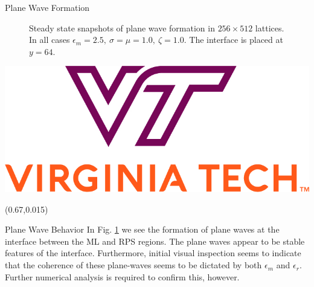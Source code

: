 \documentclass{beamer}
\begin{document}
\begin{frame}{}
\begin{textblock}{0.32}
\begin{block}{\centering Plane Wave Formation}
\begin{figure}[h]
            \caption{\centering Steady state snapshots of plane wave formation in $256 \times 512$ lattices. In all cases $\epsilon_m = 2.5, \ \sigma = \mu = 1.0, \ \zeta = 1.0$. The interface is placed at $y = 64$.}
            \label{fig:plane_waves}
        \end{figure}
    \end{block}
    \hfill
    \begin{center}
        \includegraphics[width=0.25\linewidth]{images/vt_logo.jpg}
    \end{center}
    \hfill
\end{textblock}

\begin{textblock}{0.32}(0.67,0.015)
    ~
    \vfill
    \begin{block}{\centering Plane Wave Behavior}
        In Fig. \ref{fig:plane_waves} we see the formation of plane waves at
        the interface between the ML and RPS regions. The plane waves appear to be
        stable features of the interface. Furthermore, initial visual inspection
        seems to indicate that the coherence of these plane-waves seems to be 
        dictated by both $ \epsilon_m $ and $ \epsilon_r $. Further numerical
        analysis is required to confirm this, however.
    \end{block}%


\end{textblock}
\end{frame}
\end{document}
